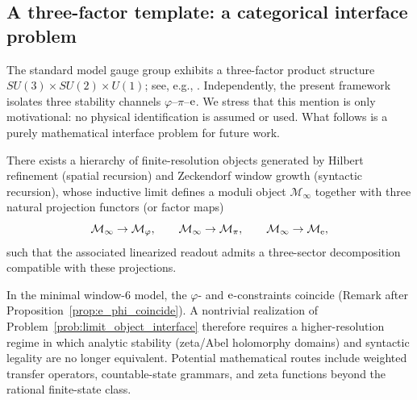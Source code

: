 \subsection{A three-factor template: a categorical interface problem}
The standard model gauge group exhibits a three-factor product structure $SU(3)\times SU(2)\times U(1)$; see, e.g., \cite{PeskinSchroeder1995}.
Independently, the present framework isolates three stability channels $\varphi$--$\pi$--$\mathrm{e}$.
We stress that this mention is only motivational: no physical identification is assumed or used.
What follows is a purely mathematical interface problem for future work.

\begin{problem}
\label{prob:limit_object_interface}
There exists a hierarchy of finite-resolution objects generated by Hilbert refinement (spatial recursion) and Zeckendorf window growth (syntactic recursion), whose inductive limit defines a moduli object $\mathcal{M}_\infty$ together with three natural projection functors (or factor maps)
\[
\mathcal{M}_\infty \to \mathcal{M}_\varphi,\qquad
\mathcal{M}_\infty \to \mathcal{M}_\pi,\qquad
\mathcal{M}_\infty \to \mathcal{M}_{\mathrm{e}},
\]
such that the associated linearized readout admits a three-sector decomposition compatible with these projections.
\end{problem}

\begin{remark}
In the minimal window-$6$ model, the $\varphi$- and $\mathrm{e}$-constraints coincide (Remark after Proposition~\ref{prop:e_phi_coincide}).
A nontrivial realization of Problem~\ref{prob:limit_object_interface} therefore requires a higher-resolution regime in which analytic stability (zeta/Abel holomorphy domains) and syntactic legality are no longer equivalent.
Potential mathematical routes include weighted transfer operators, countable-state grammars, and zeta functions beyond the rational finite-state class.
\end{remark}


